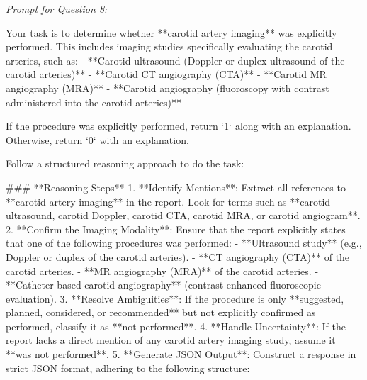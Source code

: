 \textit{\normalsize Prompt for Question  8:}
\begin{mdframed}[]
\normalsize

Your task is to determine whether **carotid artery imaging** was explicitly performed. This includes imaging studies specifically evaluating the carotid arteries, such as:  
- **Carotid ultrasound (Doppler or duplex ultrasound of the carotid arteries)**  
- **Carotid CT angiography (CTA)**  
- **Carotid MR angiography (MRA)**  
- **Carotid angiography (fluoroscopy with contrast administered into the carotid arteries)**  

If the procedure was explicitly performed, return `1` along with an explanation. Otherwise, return `0` with an explanation.

Follow a structured reasoning approach to do the task:

### **Reasoning Steps**  
1. **Identify Mentions**: Extract all references to **carotid artery imaging** in the report. Look for terms such as **carotid ultrasound, carotid Doppler, carotid CTA, carotid MRA, or carotid angiogram**.  
2. **Confirm the Imaging Modality**: Ensure that the report explicitly states that one of the following procedures was performed:  
   - **Ultrasound study** (e.g., Doppler or duplex of the carotid arteries).  
   - **CT angiography (CTA)** of the carotid arteries.  
   - **MR angiography (MRA)** of the carotid arteries.  
   - **Catheter-based carotid angiography** (contrast-enhanced fluoroscopic evaluation).  
3. **Resolve Ambiguities**: If the procedure is only **suggested, planned, considered, or recommended** but not explicitly confirmed as performed, classify it as **not performed**.  
4. **Handle Uncertainty**: If the report lacks a direct mention of any carotid artery imaging study, assume it **was not performed**.  
5. **Generate JSON Output**: Construct a response in strict JSON format, adhering to the following structure:  

\end{mdframed}

